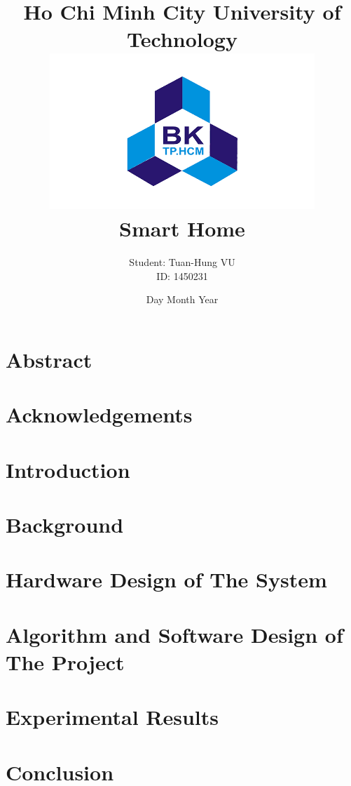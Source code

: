 \documentclass[12pt]{report}
\title{
    {\huge Ho Chi Minh City University of Technology}\\
    {\includegraphics[width=100mm, scale=0.7]{BK_logo.png}}\\
    {\huge Smart Home}\\
}
\author{Student: Tuan-Hung VU\\ID: 1450231}
\date{Day Month Year}
\begin{document}
\maketitle
\chapter*{\centering Abstract}


\chapter*{\centering Acknowledgements}


\tableofcontents
{%
\let\oldnumberline\numberline%
\renewcommand{\numberline}{\figurename~\oldnumberline}%
\listoffigures%
}
\listoftables
\printglossary[title={Acronym and Abbreviation}]
\newpage
\setcounter{page}{1}
\chapter{Introduction}

 
\chapter{Background}

% 
 
\chapter{Hardware Design of The System}

 
\chapter{Algorithm and Software Design of The Project}

 
\chapter{Experimental Results}\label{result}


\chapter{Conclusion}


\nocite{*} %


\end{document}

